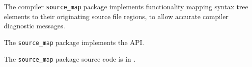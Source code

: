 
The compiler {\tt source\_map} package implements 
functionality mapping syntax tree elements 
to their originating source file regions, to allow accurate compiler diagnostic messages.

The {\tt source\_map} package implements the  API.

The {\tt source\_map} package source code is in .




